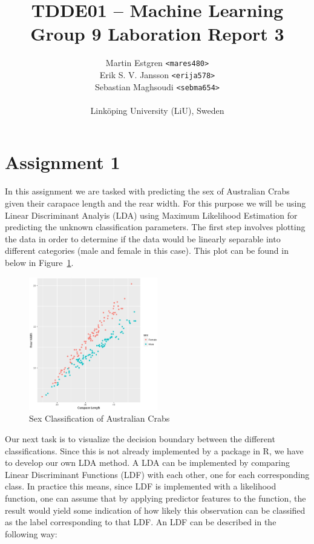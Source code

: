 \documentclass[a4paper, twocolumn]{article}
\title{TDDE01 -- Machine Learning \\
       Group 9 Laboration Report 3}
\author{{Martin Estgren \texttt{<mares480>}} \\
        {Erik S. V. Jansson \texttt{<erija578>}} \\
        {Sebastian Maghsoudi \texttt{<sebma654>}} \\~\\
        {Linköping University (LiU), Sweden}}
\begin{document}
    \maketitle %

    \section*{Assignment 1}

        In this assignment we are tasked with predicting the sex of Australian Crabs given their carapace length and the rear width. For this purpose we will be using
        Linear Discriminant Analyis (LDA) using Maximum Likelihood Estimation for predicting the unknown classification parameters. The first step involves plotting the
        data in order to determine if the data would be linearly separable into different categories (male and female in this case). This plot can be found in below in
        Figure~\ref{fig:crabs}.

        \begin{figure}
          \centering
          \caption{Sex Classification of Australian Crabs}
          \label{fig:crabs}
          \includegraphics[width=0.5\textwidth]{share/crabs.eps}
        \end{figure}

        Our next task is to visualize the decision boundary between the different classifications. Since this is not already implemented by a package in R, we have to
        develop our own LDA method. A LDA can be implemented by comparing Linear Discriminant Functions (LDF) with each other, one for each corresponding class. In practice
        this means, since LDF is implemented with a likelihood function, one can assume that by applying predictor features to the function, the result would yield some indication
        of how likely this observation can be classified as the label corresponding to that LDF. An LDF can be described in the following way:
\end{document}
